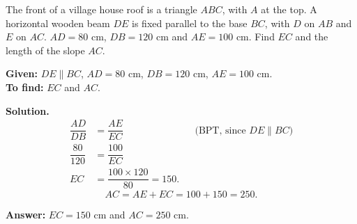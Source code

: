 \begin{example}
The front of a village house roof is a triangle $ABC$, with $A$ at the top. A horizontal wooden beam $DE$ is fixed parallel to the base $BC$, with $D$ on $AB$ and $E$ on $AC$. $AD=80$ cm, $DB=120$ cm and $AE=100$ cm. Find $EC$ and the length of the slope $AC$.


\textbf{Given:} $DE\parallel BC$, $AD=80$ cm, $DB=120$ cm, $AE=100$ cm.\\
\textbf{To find:} $EC$ and $AC$.

\textbf{Solution.}
\[
\begin{aligned}
\dfrac{AD}{DB}&=\dfrac{AE}{EC} &&\text{(BPT, since $DE\parallel BC$)}\\
\dfrac{80}{120}&=\dfrac{100}{EC}\\
EC&=\dfrac{100\times120}{80}=150.
\end{aligned}
\]
\[
AC=AE+EC=100+150=250.
\]

\textbf{Answer:} $EC=150$ cm and $AC=250$ cm.
\end{example}

